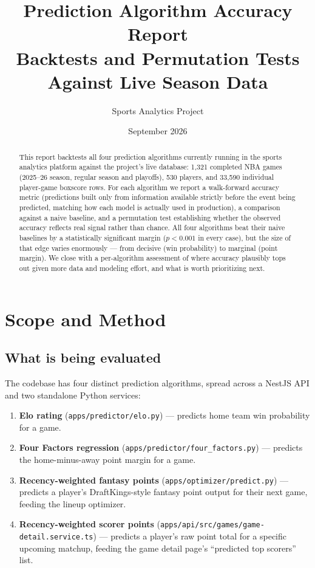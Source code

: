 \documentclass[11pt]{article}
\title{\textbf{Prediction Algorithm Accuracy Report} \\ \large Backtests and Permutation Tests Against Live Season Data}
\author{Sports Analytics Project}
\date{September 2026}
\newcommand{\code}[1]{\allowbreak\texttt{\small #1}\allowbreak}
\begin{document}
\maketitle

\begin{abstract}
\noindent This report backtests all four prediction algorithms currently running in the sports analytics
platform against the project's live database: 1,321 completed NBA games (2025--26 season, regular season and
playoffs), 530 players, and 33,590 individual player-game boxscore rows. For each algorithm we report a
walk-forward accuracy metric (predictions built only from information available strictly before the event
being predicted, matching how each model is actually used in production), a comparison against a naive
baseline, and a permutation test establishing whether the observed accuracy reflects real signal rather than
chance. All four algorithms beat their naive baselines by a statistically significant margin
($p < 0.001$ in every case), but the size of that edge varies enormously — from decisive (win probability) to
marginal (point margin). We close with a per-algorithm assessment of where accuracy plausibly tops out given
more data and modeling effort, and what is worth prioritizing next.
\end{abstract}

\tableofcontents

\section{Scope and Method}

\subsection{What is being evaluated}

The codebase has four distinct prediction algorithms, spread across a NestJS API and two standalone Python
services:

\begin{enumerate}
    \item \textbf{Elo rating} (\code{apps/predictor/elo.py}) — predicts home team win probability for a game.
    \item \textbf{Four Factors regression} (\code{apps/predictor/four\_factors.py}) — predicts the home-minus-away
    point margin for a game.
    \item \textbf{Recency-weighted fantasy points} (\code{apps/optimizer/predict.py}) — predicts a player's
    DraftKings-style fantasy point output for their next game, feeding the lineup optimizer.
    \item \textbf{Recency-weighted scorer points} (\code{apps/api/src/games/game-detail.service.ts}) — predicts a
    player's raw point total for a specific upcoming matchup, feeding the game detail page's ``predicted top
    scorers'' list.
\end{enumerate}
\end{document}
